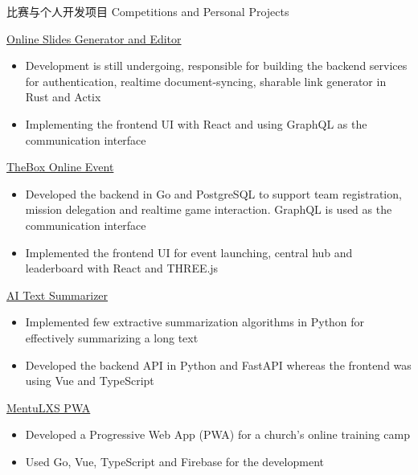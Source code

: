 \documentclass{article}
\newlength{\tabin}
\newlength{\secsep}
\newcommand{\lineunder}{\vspace*{-8pt} \\ \hspace*{-6pt} \hrulefill \\ \vspace*{-15pt}}
\newenvironment{tabbedsection}[1]{
  \begin{list}{}{
      \setlength{\itemsep}{0pt}
      \setlength{\labelsep}{0pt}
      \setlength{\labelwidth}{0pt}
      \setlength{\leftmargin}{\tabin}
      \setlength{\rightmargin}{\tabin}
      \setlength{\listparindent}{0pt}
      \setlength{\parsep}{0pt}
      \setlength{\parskip}{0pt}
      \setlength{\partopsep}{0pt}
      \setlength{\topsep}{#1}
    }
  \item[]
}{\end{list}}
\newenvironment{resume_section}[1]{
  \filbreak
  \vspace{2\secsep}
  \textsc{\large#1}
  \lineunder
  \begin{tabbedsection}{\secsep}
}{\end{tabbedsection}}
\newenvironment{resume_subsection}[2][]{
  \textbf{#2} \hfill {\footnotesize #1} \hspace{2em}
  \begin{tabbedsection}{0.5\secsep}
}{\end{tabbedsection}}
\newenvironment{subitems}{
  \renewcommand{\labelitemi}{-}
  \begin{itemize}
      \setlength{\labelsep}{1em}
}{\end{itemize}}
\begin{document}
\begin{resume_section}{比赛与个人开发项目 Competitions and Personal Projects}
  \begin{resume_subsection}[(2021年10月 - 现在)]{\href{https://github.com/marcustut/fyp}{Online Slides Generator and Editor}}
    \begin{subitems}
      \item Development is still undergoing, responsible for building the backend services for authentication, realtime document-syncing, sharable link generator in Rust and Actix
      \item Implementing the frontend UI with React and using GraphQL as the communication interface
    \end{subitems}
  \end{resume_subsection}


  \begin{resume_subsection}[(2021年10月 - 2021年11月)]{\href{https://github.com/marcustut/thebox}{TheBox Online Event}}
    \begin{subitems}
      \item Developed the backend in Go and PostgreSQL to support team registration, mission delegation and realtime game interaction. GraphQL is used as the communication interface
      \item Implemented the frontend UI for event launching, central hub and leaderboard with React and THREE.js
    \end{subitems}
  \end{resume_subsection}

  \begin{resume_subsection}[(2021年9月 - 2021年10月)]{\href{https://github.com/marcustut/summarize}{AI Text Summarizer}}
    \begin{subitems}
      \item Implemented few extractive summarization algorithms in Python for effectively summarizing a long text
      \item Developed the backend API in Python and FastAPI whereas the frontend was using Vue and TypeScript
    \end{subitems}
  \end{resume_subsection}

  \begin{resume_subsection}[(2021年8月 - 2021年9月)]{\href{https://github.com/marcustut/mentu-lxs}{MentuLXS PWA}}
    \begin{subitems}
      \item Developed a Progressive Web App (PWA) for a church's online training camp
      \item Used Go, Vue, TypeScript and Firebase for the development
    \end{subitems}
  \end{resume_subsection}


\end{resume_section}
\end{document}
